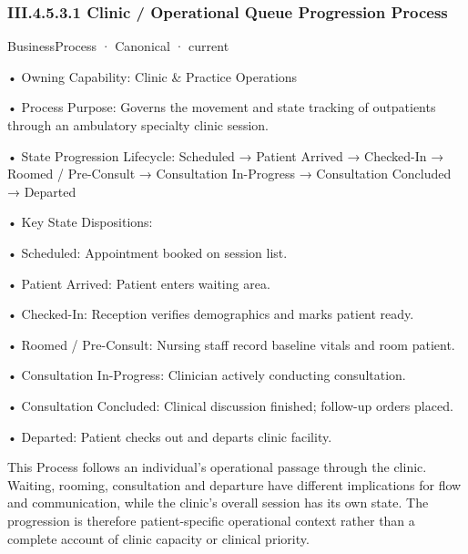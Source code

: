\subsubsection*{III.4.5.3.1 Clinic / Operational Queue Progression Process}
\label{navigation:III.4.5.3.1}

\label{element:319d6956276a4cdeb43e350e1b01d078}
{\small BusinessProcess · Canonical · current}\par

•
Owning Capability: Clinic \& Practice Operations



•
Process Purpose: Governs the movement and state tracking of outpatients through an ambulatory specialty clinic session.



•
State Progression Lifecycle: Scheduled → Patient Arrived → Checked-In → Roomed / Pre-Consult → Consultation In-Progress → Consultation Concluded → Departed



•
Key State Dispositions:



•
Scheduled: Appointment booked on session list.



•
Patient Arrived: Patient enters waiting area.



•
Checked-In: Reception verifies demographics and marks patient ready.



•
Roomed / Pre-Consult: Nursing staff record baseline vitals and room patient.



•
Consultation In-Progress: Clinician actively conducting consultation.



•
Consultation Concluded: Clinical discussion finished; follow-up orders placed.



•
Departed: Patient checks out and departs clinic facility.



This Process follows an individual's operational passage through the clinic. Waiting, rooming, consultation and departure have different implications for flow and communication, while the clinic's overall session has its own state. The progression is therefore patient-specific operational context rather than a complete account of clinic capacity or clinical priority.


